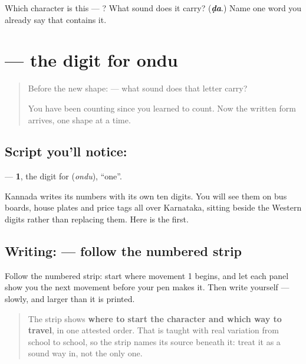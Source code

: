 \begin{tcolorbox}[breakable,colback=teal!4,colframe=teal!35!black,title={Before you move on}]
Which character is this — ? What sound does it carry? (\emph{\textbf{ḍa}}.) Name one word you already say that contains it.
\end{tcolorbox}
\section[\texorpdfstring{\kn{೧} (1)}{೧ (1)}]{ — the digit for ondu}

\label{lesson:KA-S140-digit-one}



\begin{quote}
Before the new shape: \textbf{} — what sound does that letter carry?

You have been counting since you learned to count. Now the written form arrives, one shape at a time.
\end{quote}

\subsection*{Script you'll notice: }
\textbf{} — \textbf{1}, the digit for \textbf{} (\emph{ondu}), \textquotedblleft{}one\textquotedblright{}.

Kannada writes its numbers with its own ten digits. You will see them on bus boards, house plates and price tags all over Karnataka, sitting beside the Western digits rather than replacing them. Here is the first.

\subsection*{Writing:  — follow the numbered strip}

Follow the numbered strip: start where movement 1 begins, and let each panel show you the next movement before your pen makes it. Then write  yourself — slowly, and larger than it is printed.

\begin{quote}
The strip shows \textbf{where to start the character and which way to travel}, in one attested order. That is taught with real variation from school to school, so the strip names its source beneath it: treat it as a sound way in, not the only one.
\end{quote}

